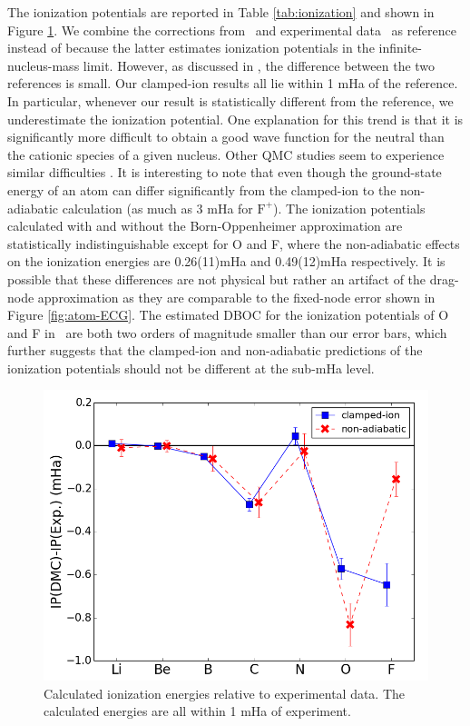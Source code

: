 \documentclass[pra,superscriptaddress,groupedaddress,twocolumn]{revtex4}
\begin{document}
The ionization potentials are reported in Table \ref{tab:ionization} and shown in Figure \ref{fig:ionization}. We combine the corrections from~\cite{Klopper_IP} and experimental data~\cite{NIST_Atoms} as reference instead of \cite{Davidson_Atoms} because the latter estimates ionization potentials in the infinite-nucleus-mass limit. However, as discussed in \cite{Seth_Bench}, the difference between the two references is small. Our clamped-ion results all lie within 1 mHa of the reference. In particular, whenever our result is statistically different from the reference, we underestimate the ionization potential. One explanation for this trend is that it is significantly more difficult to obtain a good wave function for the neutral than the cationic species of a given nucleus. Other QMC studies seem to experience similar difficulties \cite{Seth_Bench,Booth_FCIQMC,Brown_Bench}. It is interesting to note that even though the ground-state energy of an atom can differ significantly from the clamped-ion to the non-adiabatic calculation (as much as 3 mHa for $\text{F}^+$). The ionization potentials calculated with and without the Born-Oppenheimer approximation are statistically indistinguishable except for O and F, where the non-adiabatic effects on the ionization energies are 0.26(11)mHa and 0.49(12)mHa respectively. It is possible that these differences are not physical but rather an artifact of the drag-node approximation as they are comparable to the fixed-node error shown in Figure \ref{fig:atom-ECG}. The estimated DBOC for the ionization potentials of O and F in~\cite{Klopper_IP} are both two orders of magnitude smaller than our error bars, which further suggests that the clamped-ion and non-adiabatic predictions of the ionization potentials should not be different at the sub-mHa level.

\begin{figure}
\centering
\includegraphics[scale=.4]{Figures/ionization}
\caption{Calculated ionization energies relative to experimental data. The calculated energies are all within 1 mHa of experiment. \label{fig:ionization}}
\end{figure}
\end{document}
